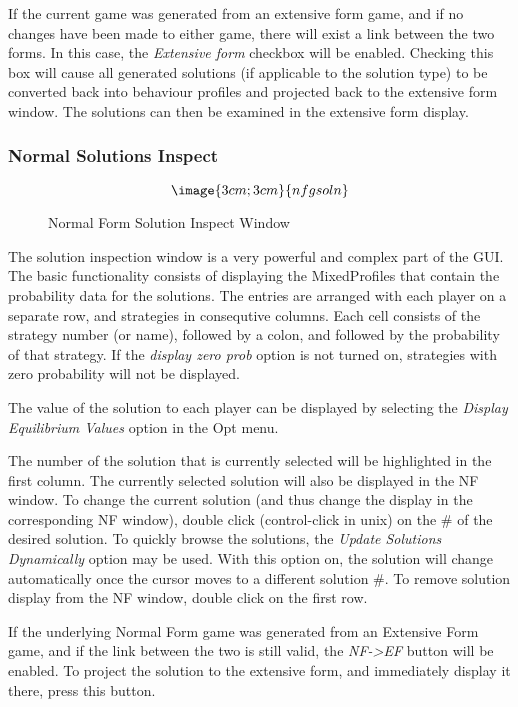 If the current game was generated from an extensive form game, and if no
changes have been made to either game, there will exist a link between the
two forms.  In this case, the {\em Extensive form} checkbox will be
enabled.  Checking this box will cause all generated solutions (if
applicable to the solution type) to be converted back into behaviour
profiles and projected back to the extensive form window.  The solutions
can then be examined in the extensive form display.


\subsubsection{Normal Solutions Inspect}\label{NormalSolutionInspect}
\begin{figure}
$$\image{3cm;3cm}{nfgsoln}$$
\caption{Normal Form Solution Inspect Window}\label{fig:nfgsoln}
\end{figure}


The solution inspection window is a very powerful and complex part of the GUI.
The basic functionality consists of displaying the MixedProfiles that contain the
probability data for the solutions.  The entries are arranged with each 
player on a separate row, and strategies in consequtive columns.  
Each cell consists of the strategy number (or name), followed by a colon, and followed
by the probability of that strategy.
If the {\em display zero prob} option is not turned on, strategies with zero probability
will not be displayed. 

The value of the solution to each player can be displayed by selecting the 
{\em Display Equilibrium Values} option in the Opt menu.

The number of the solution that is currently selected will be highlighted in the first
column.  The currently selected solution will also be displayed in the NF window.  
To change the current solution (and thus change the display in the 
corresponding NF window), double click (control-click in unix) on the \# of the
desired solution.  To quickly browse the solutions, the 
{\em Update Solutions Dynamically} 
option may be used.  With this option on, the solution will change automatically once
the cursor moves to a different solution \#.  To remove solution display from the NF window,
double click on the first row.

If the underlying Normal Form game was generated from an Extensive Form game, 
and if the link between the two is still 
valid, the {\em NF->EF} button will be enabled.  To project the solution to the 
extensive form, and immediately display it there, press this button.

